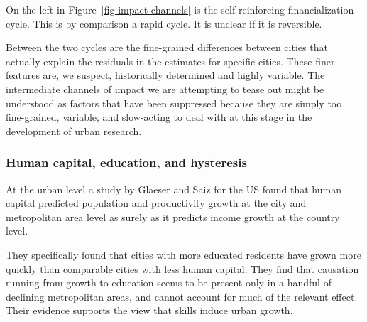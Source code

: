  
On the left in Figure~\ref{fig-impact-channels} is the self-reinforcing %
financialization cycle. This is by comparison a rapid cycle. It is unclear if it is reversible. 
 
Between the two cycles are the fine-grained differences between cities that actually explain the residuals in the estimates for specific cities. These finer features are, we suspect, historically determined and highly variable. The intermediate channels of impact we are attempting to tease out %
might be understood as factors that have been suppressed because they are simply too fine-grained, variable, and slow-acting  to deal with at this stage in the development of urban research.


\subsubsection{Human capital, education, and hysteresis}

At the urban level a study by Glaeser and Saiz \cite{glaeserRiseSkilledCity2003} for the US found that human capital predicted population and productivity growth at the city and metropolitan area level as surely as it predicts income growth at the country level. 

They specifically found that cities with more educated residents have grown more quickly than comparable cities with less human capital. They find that causation running from growth to education seems to be present only in a handful of declining metropolitan areas, and cannot account for much of the relevant effect. Their evidence supports the view that skills induce urban growth.







